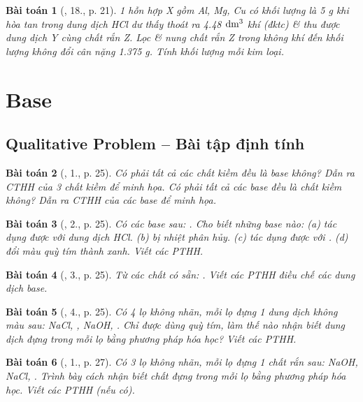 \documentclass{article}
\newtheorem{baitoan}{Bài toán}
\begin{document}
\begin{baitoan}[\cite{An_350_BT_Hoa_Hoc_9}, 18., p. 21]
	1 hỗn hợp X gồm \emph{Al, Mg, Cu} có khối lượng là \emph{5 g} khi hòa tan trong dung dịch \emph{HCl} dư thấy thoát ra \emph{4.48 $\rm dm^3$} khí (đktc) \& thu được dung dịch Y cùng chất rắn Z. Lọc \& nung chất rắn Z trong không khí đến khối lượng không đổi cân nặng \emph{1.375 g}. Tính khối lượng mỗi kim loại.
\end{baitoan}


\section{Base}

\subsection{Qualitative Problem -- Bài tập định tính}

\begin{baitoan}[\cite{SGK_Hoa_Hoc_9}, 1., p. 25]
	Có phải tất cả các chất kiềm đều là base không? Dẫn ra CTHH của 3 chất kiềm để minh họa. Có phải tất cả các base đều là chất kiềm không? Dẫn ra CTHH của các base để minh họa.
\end{baitoan}

\begin{baitoan}[\cite{SGK_Hoa_Hoc_9}, 2., p. 25]
	Có các base sau: \emph{}. Cho biết những base nào: (a) tác dụng được với dung dịch \emph{HCl}. (b) bị nhiệt phân hủy. (c) tác dụng được với \emph{}. (d) đổi màu quỳ tím thành xanh. Viết các PTHH.
\end{baitoan}

\begin{baitoan}[\cite{SGK_Hoa_Hoc_9}, 3., p. 25]
	Từ các chất có sẵn: \emph{}. Viết các PTHH điều chế các dung dịch base.
\end{baitoan}

\begin{baitoan}[\cite{SGK_Hoa_Hoc_9}, 4., p. 25]
	Có 4 lọ không nhãn, mỗi lọ đựng 1 dung dịch không màu sau: \emph{NaCl, , NaOH, }. Chỉ được dùng quỳ tím, làm thế nào nhận biết dung dịch đựng trong mỗi lọ bằng phương pháp hóa học? Viết các PTHH.
\end{baitoan}

\begin{baitoan}[\cite{SGK_Hoa_Hoc_9}, 1., p. 27]
	Có 3 lọ không nhãn, mỗi lọ đựng 1 chất rắn sau: \emph{NaOH, NaCl, }. Trình bày cách nhận biết chất đựng trong mỗi lọ bằng phương pháp hóa học. Viết các PTHH (nếu có).
\end{baitoan}
\end{document}
